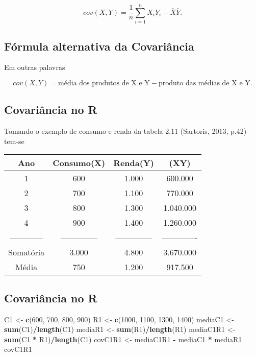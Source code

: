 \documentclass[
]{book}
\newenvironment{Shaded}{\begin{snugshade}}{\end{snugshade}}
\newcommand{\DecValTok}[1]{\textcolor[rgb]{0.00,0.00,0.81}{#1}}
\newcommand{\KeywordTok}[1]{\textcolor[rgb]{0.13,0.29,0.53}{\textbf{#1}}}
\newcommand{\NormalTok}[1]{#1}
\newcommand{\OperatorTok}[1]{\textcolor[rgb]{0.81,0.36,0.00}{\textbf{#1}}}
\newcommand{\StringTok}[1]{\textcolor[rgb]{0.31,0.60,0.02}{#1}}
\begin{document}
\begin{equation*}
  cov(X,Y) = \frac{1}{n}\sum_{i=1}^{n}X_{i}Y_{i} - \overline{X}\overline{Y}.
\end{equation*}

\hypertarget{fuxf3rmula-alternativa-da-covariuxe2ncia}{%
\subsection{Fórmula alternativa da Covariância}\label{fuxf3rmula-alternativa-da-covariuxe2ncia}}

Em outras palavras

\begin{equation*}
  cov(X,Y) = \text{média dos produtos de X e Y} - \text{produto das médias de X e Y}.
\end{equation*}

\hypertarget{covariuxe2ncia-no-r}{%
\subsection{Covariância no R}\label{covariuxe2ncia-no-r}}

Tomando o exemplo de consumo e renda da tabela 2.11 (Sartoris, 2013, p.42) tem-se

\begin{longtable}[]{@{}cccc@{}}
\toprule
Ano & Consumo(X) & Renda(Y) & (XY)\tabularnewline
\midrule
\endhead
1 & 600 & 1.000 & 600.000\tabularnewline
2 & 700 & 1.100 & 770.000\tabularnewline
3 & 800 & 1.300 & 1.040.000\tabularnewline
4 & 900 & 1.400 & 1.260.000\tabularnewline
------------ & -------------- & -------------- & -------------\tabularnewline
Somatória & 3.000 & 4.800 & 3.670.000\tabularnewline
Média & 750 & 1.200 & 917.500\tabularnewline
\bottomrule
\end{longtable}

\hypertarget{covariuxe2ncia-no-r-1}{%
\subsection{Covariância no R}\label{covariuxe2ncia-no-r-1}}

\begin{Shaded}
\begin{Highlighting}[]
\NormalTok{C1 <-}\StringTok{ }\KeywordTok{c}\NormalTok{(}\DecValTok{600}\NormalTok{, }\DecValTok{700}\NormalTok{, }\DecValTok{800}\NormalTok{, }\DecValTok{900}\NormalTok{)}
\NormalTok{R1 <-}\StringTok{ }\KeywordTok{c}\NormalTok{(}\DecValTok{1000}\NormalTok{, }\DecValTok{1100}\NormalTok{, }\DecValTok{1300}\NormalTok{, }\DecValTok{1400}\NormalTok{)}
\NormalTok{mediaC1 <-}\StringTok{ }\KeywordTok{sum}\NormalTok{(C1)}\OperatorTok{/}\KeywordTok{length}\NormalTok{(C1)}
\NormalTok{mediaR1 <-}\StringTok{ }\KeywordTok{sum}\NormalTok{(R1)}\OperatorTok{/}\KeywordTok{length}\NormalTok{(R1)}
\NormalTok{mediaC1R1 <-}\StringTok{ }\KeywordTok{sum}\NormalTok{(C1 }\OperatorTok{*}\StringTok{ }\NormalTok{R1)}\OperatorTok{/}\KeywordTok{length}\NormalTok{(C1)}
\NormalTok{covC1R1 <-}\StringTok{ }\NormalTok{mediaC1R1 }\OperatorTok{-}\StringTok{ }\NormalTok{mediaC1 }\OperatorTok{*}\StringTok{ }\NormalTok{mediaR1}
\NormalTok{covC1R1}
\end{Highlighting}
\end{Shaded}
\end{document}
